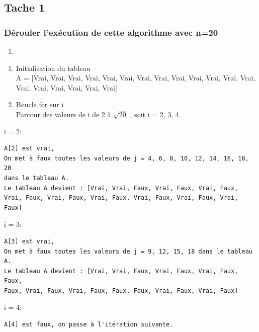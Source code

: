 \documentclass[
    ]{article}
\providecommand{\tightlist}{%
  \setlength{\itemsep}{0pt}\setlength{\parskip}{0pt}}
\begin{document}
\hypertarget{tache-1}{%
\subsection{Tache 1}\label{tache-1}}

\hypertarget{duxe9rouler-lexuxe9cution-de-cette-algorithme-avec-n20}{%
\subsubsection{Dérouler l'exécution de cette algorithme avec
n=20}\label{duxe9rouler-lexuxe9cution-de-cette-algorithme-avec-n20}}

\begin{enumerate}
\def\labelenumi{\arabic{enumi}.}
\tightlist
\item
\end{enumerate}

\begin{enumerate}
\def\labelenumi{\Alph{enumi})}
\item
  Initialisation du tableau\\
  A = {[}Vrai, Vrai, Vrai, Vrai, Vrai, Vrai, Vrai, Vrai, Vrai, Vrai,
  Vrai, Vrai, Vrai, Vrai, Vrai, Vrai, Vrai, Vrai, Vrai{]}
\item
  Boucle for sur i\\
  Parcour des valeurs de i de 2 à \(\sqrt{20}\) , soit i = 2, 3, 4.
\end{enumerate}

i = 2:

\begin{verbatim}
A[2] est vrai,  
On met à faux toutes les valeurs de j = 4, 6, 8, 10, 12, 14, 16, 18, 20  
dans le tableau A.  
Le tableau A devient : [Vrai, Vrai, Faux, Vrai, Faux, Vrai, Faux,  
Vrai, Faux, Vrai, Faux, Vrai, Faux, Vrai, Faux, Vrai, Faux, Vrai, Faux]  
\end{verbatim}

i = 3:

\begin{verbatim}
A[3] est vrai,  
On met à faux toutes les valeurs de j = 9, 12, 15, 18 dans le tableau A.  
Le tableau A devient : [Vrai, Vrai, Faux, Vrai, Faux, Vrai, Faux, Faux,  
Faux, Vrai, Faux, Vrai, Faux, Faux, Faux, Vrai, Faux, Vrai, Faux]  
\end{verbatim}

i = 4:

\begin{verbatim}
A[4] est faux, on passe à l'itération suivante.  
\end{verbatim}
\end{document}
